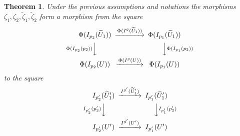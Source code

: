 \documentclass[12pt]{article}
\newtheorem{theorem}[proposition]{Theorem}
\newcommand{\llabel}[1]{\label{#1}}
\newcommand{\wt}{\widetilde}
\begin{document}
%
\begin{theorem}
\llabel{2015.04.10.th3}
Under the previous assumptions and notations the morphisms $\zeta_1,\zeta_2,\wt{\zeta}_1,\wt{\zeta}_2$ form a morphism from the square
%
$$
\begin{CD}
\Phi(I_{p_2}(\wt{U}_1)) @>\Phi(I^g(\wt{U}_1))>> \Phi(I_{p_1}(\wt{U}_1))\\
@V\Phi(I_{p_2}(p_2)) VV @VV \Phi(I_{p_1}(p_2)) V\\
\Phi(I_{p_2}(U)) @>\Phi(I^g(U))>> \Phi(I_{p_1}(U))
\end{CD}
$$
%
to the square
%
$$
\begin{CD}
I_{p_2'}(\wt{U}_1') @>I^{g'}(\wt{U}_1')>> I_{p_1'}(\wt{U}_1')\\
@VI_{p_2'}(p_2') VV @VV I_{p_1'}(p_2') V\\
I_{p_2'}(U') @>I^{g'}(U')>> I_{p_1'}(U')
\end{CD}
$$
%
\end{theorem}
%
\end{document}
